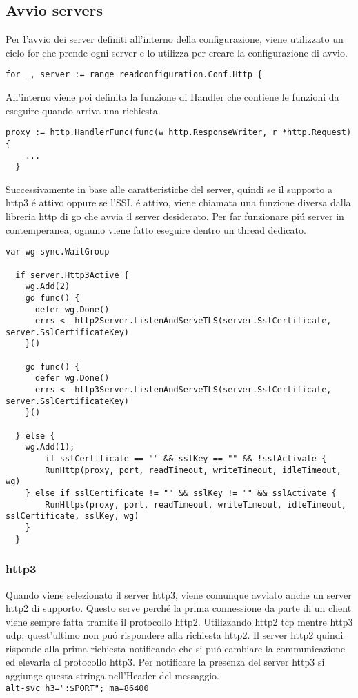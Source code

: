 \subsection{Avvio servers}
Per l'avvio dei server definiti all'interno della configurazione, viene utilizzato un ciclo for che prende ogni server e lo utilizza per creare la configurazione di avvio.
\begin{lstlisting}[language=Golang]
for _, server := range readconfiguration.Conf.Http {
\end{lstlisting}
All'interno viene poi definita la funzione di Handler che contiene le funzioni da eseguire quando arriva una richiesta.
\begin{lstlisting}[language=Golang]
  proxy := http.HandlerFunc(func(w http.ResponseWriter, r *http.Request) {
    ...
  }
\end{lstlisting}
Successivamente in base alle caratteristiche del server, quindi se il supporto a http3 é attivo oppure se l'SSL é attivo, viene chiamata una funzione diversa dalla libreria http di go che avvia il server desiderato. Per far funzionare piú server in contemperanea, ognuno viene fatto eseguire dentro un thread dedicato.

\begin{lstlisting}[language=Golang]
  var wg sync.WaitGroup

  if server.Http3Active {
    wg.Add(2)
    go func() {
      defer wg.Done()
      errs <- http2Server.ListenAndServeTLS(server.SslCertificate, server.SslCertificateKey)
    }()

    go func() {
      defer wg.Done()
      errs <- http3Server.ListenAndServeTLS(server.SslCertificate, server.SslCertificateKey)
    }()

  } else {
    wg.Add(1);
    	if sslCertificate == "" && sslKey == "" && !sslActivate {
		RunHttp(proxy, port, readTimeout, writeTimeout, idleTimeout, wg)
	} else if sslCertificate != "" && sslKey != "" && sslActivate {
		RunHttps(proxy, port, readTimeout, writeTimeout, idleTimeout, sslCertificate, sslKey, wg)
	}
  }
\end{lstlisting}
\subsubsection{http3}
Quando viene selezionato il server http3, viene comunque avviato anche un server http2 di supporto. Questo serve perché la prima connessione da parte di un client viene sempre fatta tramite il protocollo http2. Utilizzando http2 tcp mentre http3 udp, quest'ultimo non puó rispondere alla richiesta http2. Il server http2 quindi risponde alla prima richiesta notificando che si puó cambiare la communicazione ed elevarla al protocollo http3. Per notificare la presenza del server http3 si aggiunge questa stringa nell'Header del messaggio.\\
\texttt{alt-svc h3=":\$PORT"; ma=86400}

